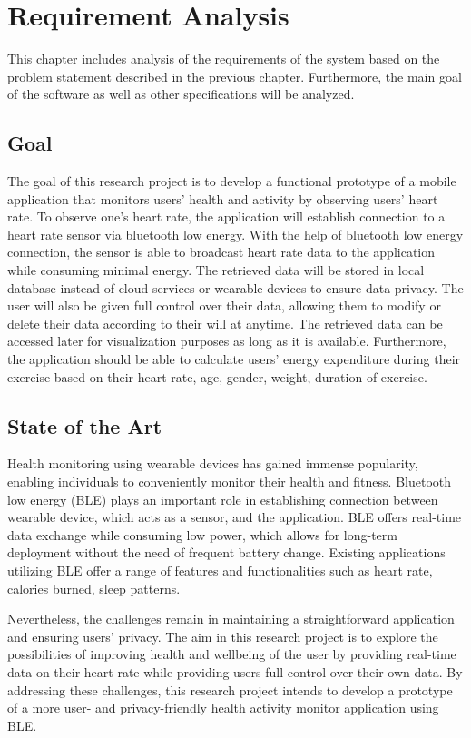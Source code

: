 \chapter{Requirement Analysis}
This chapter includes analysis of the requirements of the system based on the problem statement described in the previous chapter. Furthermore, the main goal of the software as well as other specifications will be analyzed.

\section{Goal}
The goal of this research project is to develop a functional prototype of a mobile application that monitors users' health and activity by observing users' heart rate. To observe one's heart rate, the application will establish connection to a heart rate sensor via bluetooth low energy.
With the help of bluetooth low energy connection, the sensor is able to broadcast heart rate data to the application while consuming minimal energy.
The retrieved data will be stored in local database instead of cloud services or wearable devices to ensure data privacy. The user will also be given full control over their data, allowing them to modify or delete their data according to their will at anytime.
The retrieved data can be accessed later for visualization purposes as long as it is available. Furthermore, the application should be able to calculate users' energy expenditure during their exercise based on their heart rate, age, gender, weight, duration of exercise.

\section{State of the Art}
Health monitoring using wearable devices has gained immense popularity, enabling individuals to conveniently monitor their health and fitness. Bluetooth low energy (BLE) plays an important role in establishing connection between wearable device, which acts as a sensor, and the application. 
BLE offers real-time data exchange while consuming low power, which allows for long-term deployment without the need of frequent battery change. \cite{strey2013ble}
Existing applications utilizing BLE offer a range of features and functionalities such as heart rate, calories burned, sleep patterns.

Nevertheless, the challenges remain in maintaining a straightforward application and ensuring users' privacy. The aim in this research project is to explore the possibilities of improving health and wellbeing of the user by providing real-time data on their heart rate while providing users full control over their own data.
By addressing these challenges, this research project intends to develop a prototype of a more user- and privacy-friendly health activity monitor application using BLE.
\newpage

